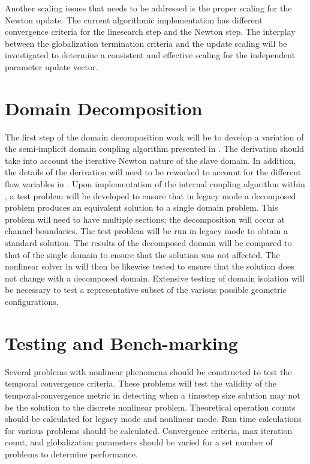 Another scaling issues that needs to be addressed is the proper scaling for the Newton update.
The current algorithmic implementation has different convergence criteria for the linesearch step and the Newton step.
The interplay between the globalization termination criteria and the update scaling will be investigated to determine a consistent and effective scaling for the independent parameter update vector. 

\section{Domain Decomposition}
\label{sect:domain_coupling}
The first step of the domain decomposition work will be to develop a variation of the semi-implicit domain coupling algorithm presented in .
The derivation should take into account the iterative Newton nature of the slave domain. 
In addition, the details of the derivation will need to be reworked to account for the different flow variables in \cobra{}.
Upon implementation of the internal coupling algorithm within \cobra{}, a test problem will be developed to ensure that in legacy mode a decomposed problem produces an equivalent solution to a single domain problem.
This problem will need to have multiple sections; the decomposition will occur at channel boundaries.
The test problem will be run in legacy mode to obtain a standard solution.
The results of the decomposed domain will be compared to that of the single domain to ensure that the solution was not affected.
The nonlinear solver in \cobra{} will then be likewise tested to ensure that the solution does not change with a decomposed domain.
Extensive testing of domain isolation will be necessary to test a representative subset of the various possible geometric configurations.

\section{Testing and Bench-marking}
\label{sect:proposal_temporal_testing}
Several problems with nonlinear phenomena should be constructed to test the temporal convergence criteria.
These problems will test the validity of the temporal-convergence metric in detecting when a timestep size solution may not be the solution to the discrete nonlinear problem.
Theoretical operation counts should be calculated for legacy mode and nonlinear mode.
Run time calculations for various problems should be calculated.
Convergence criteria, max iteration count, and globalization parameters should be varied for a set number of problems to determine performance.

